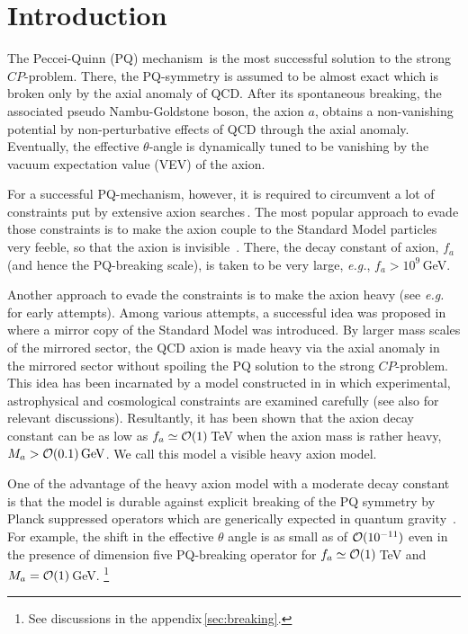 \documentclass[aps,amsmath,preprint,epsf,superscriptaddress,nofootinbib,notitlepage]{revtex4-1}
\begin{document}
\section{Introduction}
The Peccei-Quinn (PQ) mechanism\,\cite{Peccei:1977hh,Peccei:1977ur,Weinberg:1977ma,Wilczek:1977pj} 
is the most successful solution to the strong $CP$-problem.
There, the PQ-symmetry is assumed to be almost exact which is broken only by the axial anomaly of QCD. 
After its spontaneous breaking, the associated pseudo Nambu-Goldstone boson, the axion $a$, 
obtains a non-vanishing potential by non-perturbative effects of QCD through the axial anomaly. 
Eventually, the effective $\theta$-angle is dynamically tuned to be vanishing by the vacuum expectation value (VEV) of the axion. 

For a successful PQ-mechanism, however, it is required to circumvent a lot of constraints
put by extensive axion searches\,\cite[for review]{Agashe:2014kda}.
The most popular approach to evade those constraints is to make the axion couple to the Standard Model particles very feeble,
so that the axion is invisible~\cite{Kim:1979if,Shifman:1979if,Zhitnitsky:1980tq,Dine:1981rt}.
There, the decay constant of axion, $f_a$ (and hence the PQ-breaking scale),  is taken to be very large, {\it e.g.}, $f_a>10^9$\,GeV. 

Another approach to evade the constraints is to make the axion heavy (see {\it e.g.} \cite{Dimopoulos:1979pp,Tye:1981zy} for early attempts). 
Among various attempts, a successful idea was proposed in \cite{Rubakov:1997vp} where a mirror copy of the Standard Model was introduced.
By larger mass scales of the mirrored sector, the QCD axion is made heavy 
via the axial anomaly in the mirrored sector without spoiling the PQ solution to the strong $CP$-problem.
This idea has been incarnated by a model constructed in \cite{Fukuda:2015ana}
in which experimental, astrophysical and cosmological constraints are examined carefully
(see also \cite{Berezhiani:2000gh,Hook:2014cda,Albaid:2015axa,Barbieri:2016zxn} for relevant discussions).
Resultantly, it has been shown that the axion decay constant can be as low as $f_a\simeq {\cal O}(1)$\,TeV 
when the axion mass is rather heavy, $M_a>{\cal O}(0.1)\,{\rm GeV}$.
We call this model a visible heavy axion model.

One of the advantage of the heavy axion model with a moderate decay constant
is that  the model is durable against  explicit breaking of the PQ symmetry 
by  Planck suppressed operators which are generically expected in 
quantum gravity~\cite{Hawking:1987mz,Lavrelashvili:1987jg,Giddings:1988cx,Coleman:1988tj,Gilbert:1989nq,Banks:2010zn}.
For example, the shift in the effective $\theta$ angle is as small as of ${\cal O}(10^{-11})$ 
even in the presence of dimension five PQ-breaking operator for $f_a \simeq {\cal O}(1)$\,TeV
and $M_a = {\cal O}(1)$\,GeV.%
\footnote{See discussions in the appendix\,\ref{sec:breaking}.}
\end{document}
